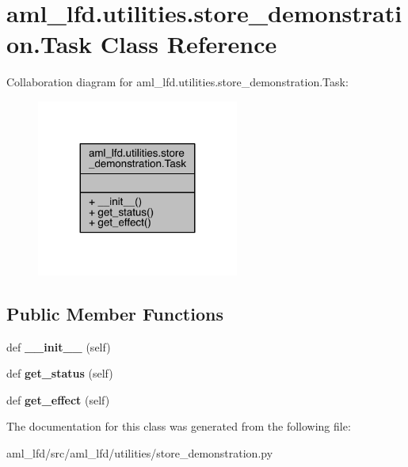 \hypertarget{classaml__lfd_1_1utilities_1_1store__demonstration_1_1_task}{}\section{aml\+\_\+lfd.\+utilities.\+store\+\_\+demonstration.\+Task Class Reference}
\label{classaml__lfd_1_1utilities_1_1store__demonstration_1_1_task}


Collaboration diagram for aml\+\_\+lfd.\+utilities.\+store\+\_\+demonstration.\+Task\+:\nopagebreak
\begin{figure}[H]
\begin{center}
\leavevmode
\includegraphics[width=188pt]{classaml__lfd_1_1utilities_1_1store__demonstration_1_1_task__coll__graph}
\end{center}
\end{figure}
\subsection*{Public Member Functions}
\begin{DoxyCompactItemize}
\item 
\hypertarget{classaml__lfd_1_1utilities_1_1store__demonstration_1_1_task_a4ce3ad6f8e2d3d6480e835314952b1a1}{}\label{classaml__lfd_1_1utilities_1_1store__demonstration_1_1_task_a4ce3ad6f8e2d3d6480e835314952b1a1} 
def {\bfseries \+\_\+\+\_\+init\+\_\+\+\_\+} (self)
\item 
\hypertarget{classaml__lfd_1_1utilities_1_1store__demonstration_1_1_task_abba6e694b00e75fa26daf543d1a5ab20}{}\label{classaml__lfd_1_1utilities_1_1store__demonstration_1_1_task_abba6e694b00e75fa26daf543d1a5ab20} 
def {\bfseries get\+\_\+status} (self)
\item 
\hypertarget{classaml__lfd_1_1utilities_1_1store__demonstration_1_1_task_a48e41283ac81edf9025dd9845ef90009}{}\label{classaml__lfd_1_1utilities_1_1store__demonstration_1_1_task_a48e41283ac81edf9025dd9845ef90009} 
def {\bfseries get\+\_\+effect} (self)
\end{DoxyCompactItemize}


The documentation for this class was generated from the following file\+:\begin{DoxyCompactItemize}
\item 
aml\+\_\+lfd/src/aml\+\_\+lfd/utilities/store\+\_\+demonstration.\+py\end{DoxyCompactItemize}
